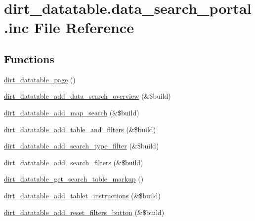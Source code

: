 \hypertarget{dirt__datatable_8data__search__portal_8inc}{}\section{dirt\+\_\+datatable.\+data\+\_\+search\+\_\+portal.\+inc File Reference}
\label{dirt__datatable_8data__search__portal_8inc}
\subsection*{Functions}
\begin{DoxyCompactItemize}
\item 
\mbox{\hyperlink{dirt__datatable_8data__search__portal_8inc_ac694b6f1043d9715e4ba411788222992}{dirt\+\_\+datatable\+\_\+page}} ()
\item 
\mbox{\hyperlink{dirt__datatable_8data__search__portal_8inc_ac65e9af96bef69d63db239807ff22fa2}{dirt\+\_\+datatable\+\_\+add\+\_\+data\+\_\+search\+\_\+overview}} (\&\$build)
\item 
\mbox{\hyperlink{dirt__datatable_8data__search__portal_8inc_ab3e7810ba8361b5e2b35fea8f6a8d3f1}{dirt\+\_\+datatable\+\_\+add\+\_\+map\+\_\+search}} (\&\$build)
\item 
\mbox{\hyperlink{dirt__datatable_8data__search__portal_8inc_ad5bac301b82c5ff4e3d18a60fe662037}{dirt\+\_\+datatable\+\_\+add\+\_\+table\+\_\+and\+\_\+filters}} (\&\$build)
\item 
\mbox{\hyperlink{dirt__datatable_8data__search__portal_8inc_a5cb4daeeff10e5b4962bf738d12eed49}{dirt\+\_\+datatable\+\_\+add\+\_\+search\+\_\+type\+\_\+filter}} (\&\$build)
\item 
\mbox{\hyperlink{dirt__datatable_8data__search__portal_8inc_aa08c5bd45164a2e0b70d154471bd8009}{dirt\+\_\+datatable\+\_\+add\+\_\+search\+\_\+filters}} (\&\$build)
\item 
\mbox{\hyperlink{dirt__datatable_8data__search__portal_8inc_a651362da059a6c1fc1e6a25b5c467a0f}{dirt\+\_\+datatable\+\_\+get\+\_\+search\+\_\+table\+\_\+markup}} ()
\item 
\mbox{\hyperlink{dirt__datatable_8data__search__portal_8inc_afcb783e95f43c8e2b4758db8bd12a077}{dirt\+\_\+datatable\+\_\+add\+\_\+tablet\+\_\+instructions}} (\&\$build)
\item 
\mbox{\hyperlink{dirt__datatable_8data__search__portal_8inc_a2f656699482ec6e5fb3549410b98b5c3}{dirt\+\_\+datatable\+\_\+add\+\_\+reset\+\_\+filters\+\_\+button}} (\&\$build)

\end{DoxyCompactItemize}
